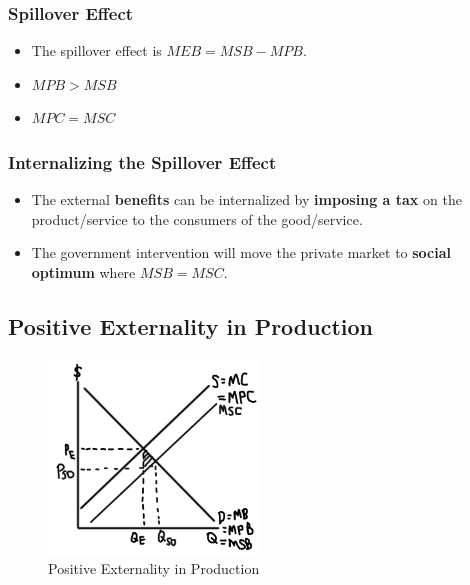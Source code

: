 \documentclass[
  letterpaper,
  DIV=11,
  numbers=noendperiod]{scrartcl}
\providecommand{\tightlist}{%
  \setlength{\itemsep}{0pt}\setlength{\parskip}{0pt}}\usepackage{longtable,booktabs,array}
\begin{document}
\hypertarget{spillover-effect-1}{%
\subsubsection{Spillover Effect}\label{spillover-effect-1}}

\begin{itemize}
\tightlist
\item
  The spillover effect is \(MEB = MSB-MPB\).
\item
  \(MPB > MSB\)
\item
  \(MPC = MSC\)
\end{itemize}

\hypertarget{internalizing-the-spillover-effect-1}{%
\subsubsection{Internalizing the Spillover
Effect}\label{internalizing-the-spillover-effect-1}}

\begin{itemize}
\tightlist
\item
  The external \textbf{benefits} can be internalized by \textbf{imposing
  a tax} on the product/service to the consumers of the good/service.
\item
  The government intervention will move the private market to
  \textbf{social optimum} where \(MSB = MSC\).
\end{itemize}

\newpage{}

\hypertarget{positive-externality-in-production}{%
\subsection{Positive Externality in
Production}\label{positive-externality-in-production}}

\begin{figure}

{\centering \includegraphics[width=0.5\textwidth,height=\textheight]{img/pos-prod.png}

}

\caption{Positive Externality in Production}

\end{figure}
\end{document}
